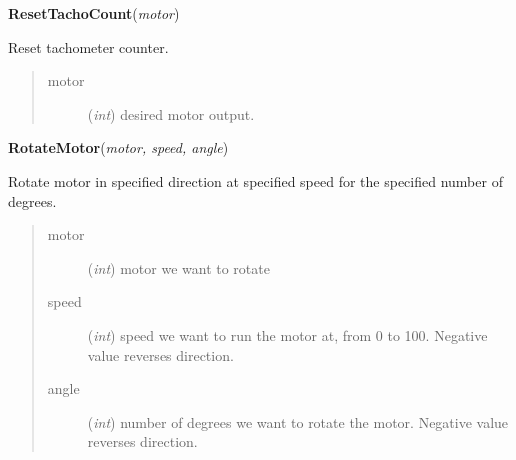 \documentclass[10pt,a4paper]{article}
\begin{document}
 

\vspace{6pt}
{\bf ResetTachoCount}({\it motor}) 
    
    Reset tachometer counter. 


    

\begin{quote}
    \begin{description}
        
\item[motor] ({\emph{int}}) desired motor output.

    \end{description}
\end{quote}

 

\vspace{6pt}
{\bf RotateMotor}({\it motor, speed, angle}) 
    
    Rotate motor in specified direction at specified speed for the specified
    number of degrees.




    
    
    

\begin{quote}
    \begin{description}
        
\item[motor] ({\emph{int}}) motor we want to rotate

\item[speed] ({\emph{int}}) speed we want to run the motor at, from 0 to 100. Negative value reverses direction.

\item[angle] ({\emph{int}}) number of degrees we want to rotate the motor. Negative value reverses direction.

    \end{description}
\end{quote}

 
\end{document}
